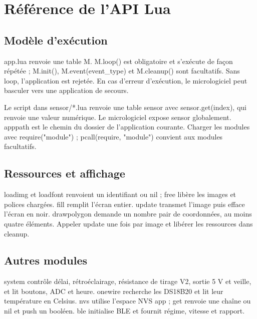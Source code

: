 \chapter{Référence de l'API Lua}
\section{Modèle d'exécution}
app.lua renvoie une table M. M.loop() est obligatoire et s'exécute de façon répétée ; M.init(), M.event(event\_type) et M.cleanup() sont facultatifs. Sans loop, l'application est rejetée. En cas d'erreur d'exécution, le micrologiciel peut basculer vers une application de secours.

Le script dans sensor/*.lua renvoie une table sensor avec sensor.get(index), qui renvoie une valeur numérique. Le micrologiciel expose sensor globalement. apppath est le chemin du dossier de l'application courante. Charger les modules avec require("module") ; pcall(require, "module") convient aux modules facultatifs.
\section{Ressources et affichage}
loadimg et loadfont renvoient un identifiant ou nil ; free libère les images et polices chargées. fill remplit l'écran entier. update transmet l'image puis efface l'écran en noir. drawpolygon demande un nombre pair de coordonnées, au moins quatre éléments. Appeler update une fois par image et libérer les ressources dans cleanup.
\section{Autres modules}
system contrôle délai, rétroéclairage, résistance de tirage V2, sortie 5 V et veille, et lit boutons, ADC et heure. onewire recherche les DS18B20 et lit leur température en Celsius. nvs utilise l'espace NVS app ; get renvoie une chaîne ou nil et push un booléen. ble initialise BLE et fournit régime, vitesse et rapport.
